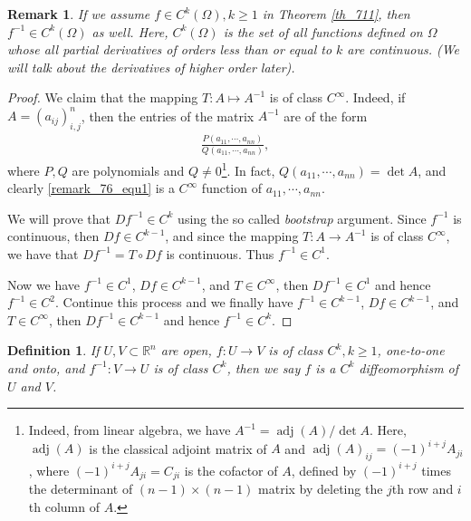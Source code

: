 \documentclass[10pt]{book}
\newtheorem{definition}{Definition}[chapter]
\newtheorem{remark}{Remark}[chapter]
\theoremstyle{definition}
\numberwithin{equation}{chapter}
\begin{document}
\medskip

\begin{remark}
If we assume $f \in C^k(\Omega), k \geq 1$ in Theorem \ref{th_711}, then $f^{-1} \in C^k(\Omega)$ as well. Here, $C^k(\Omega)$ is the set of all functions defined on $\Omega$ whose all partial derivatives of orders less than or equal to $k$ are continuous. (We will talk about the derivatives of higher order later). 
\end{remark}
\begin{proof}
We claim that the mapping $T: A \mapsto A^{-1}$ is of class $C^\infty$. Indeed, if $A = \left(a_{ij}\right)^n_{i,j}$, then the entries of the matrix $A^{-1}$ are of the form
\begin{align}\label{remark_76_equ1}
    \frac{P(a_{11}, \cdots, a_{nn})}{Q(a_{11}, \cdots, a_{nn})},
\end{align}
where $P, Q$ are polynomials and $Q \neq 0$\footnote{Indeed, from linear algebra, we have $A^{-1} = \operatorname{adj}(A)/\det A$. Here, $\operatorname{adj}(A)$ is the classical adjoint matrix of $A$ and $\operatorname{adj}(A)_{ij} = (-1)^{i+j} A_{ji}$, where $(-1)^{i+j} A_{ji} = C_{ji}$ is the cofactor of $A$, defined by $(-1)^{i+j}$ times the determinant of $(n-1) \times (n-1)$ matrix by deleting the $j$th row and $i$th column of $A$.}. In fact, $Q(a_{11}, \cdots, a_{nn}) = \det A$, and clearly \eqref{remark_76_equ1} is a $C^\infty$ function of $a_{11}, \cdots, a_{nn}$. 

We will prove that $Df^{-1} \in C^k$ using the so called {\em bootstrap} argument. Since $f^{-1}$ is continuous, then $Df \in C^{k-1}$, and since the mapping $T: A \to A^{-1}$ is of class $C^\infty$, we have that $Df^{-1} = T \circ Df$ is continuous. Thus $f^{-1} \in C^1$.  

Now we have $f^{-1} \in C^1$, $Df \in C^{k-1}$, and $T \in C^\infty$, then $Df^{-1} \in C^1$ and hence $f^{-1} \in C^2$. Continue this process and we finally have $f^{-1} \in C^{k-1}$, $Df \in C^{k-1}$, and $T \in C^\infty$, then $Df^{-1} \in C^{k-1}$ and hence $f^{-1} \in C^k$.
\end{proof}

\medskip

\begin{definition}
If $U, V \subset \mathbb{R}^n$ are open, $f: U \to V$ is of class $C^k, k \geq 1$, one-to-one and onto, and $f^{-1}: V \to U$ is of class $C^k$, then we say $f$ is a $C^k$ diffeomorphism of $U$ and $V$.
\end{definition}
\end{document}
